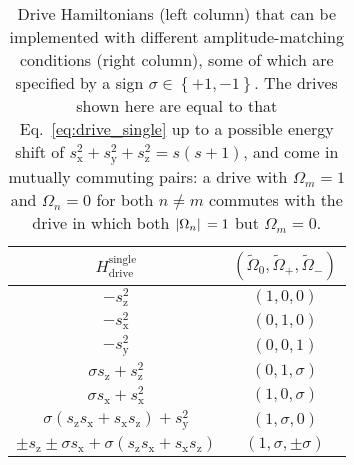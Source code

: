 \documentclass[nofootinbib,twocolumn]{revtex4-2}
\renewcommand{\t}{\text} %
\newcommand{\p}[1]{\left(#1\right)} %
\renewcommand{\set}[1]{\left\{#1\right\}} %
\newcommand{\1}{\mathds{1}}
\newcommand{\x}{\text{x}}
\newcommand{\y}{\text{y}}
\newcommand{\z}{\text{z}}
\begin{document}
\begin{table}
\centering
\caption{
Drive Hamiltonians (left column) that can be implemented with different amplitude-matching conditions (right column), some of which are specified by a sign $\sigma\in\set{+1,-1}$.
The drives shown here are equal to that Eq.~\eqref{eq:drive_single} up to a possible energy shift of $s_\x^2+s_\y^2+s_\z^2=s(s+1)$, and come in mutually commuting pairs: a drive with $\Omega_m=1$ and $\Omega_n=0$ for both $n\ne m$ commutes with the drive in which both $\abs*{\Omega_n}=1$ but $\Omega_m=0$.
}
\vspace{.5em}
\begin{tabular}{c|c}
  $H_{\t{drive}}^{\t{single}}$
  & $(\tilde\Omega_0,\tilde\Omega_+,\tilde\Omega_-)$
  \\ \hline\hline
  $-s_\z^2$ & $\p{1,0,0}$
  \\ \hline
   $-s_\x^2$ & $\p{0,1,0}$
  \\ \hline
  $-s_\y^2$ & $\p{0,0,1}$
  \\ \hline
  $\sigma s_\z + s_\z^2$ & $\p{0,1,\sigma}$
  \\ \hline
  $\sigma s_\x + s_\x^2$ & $\p{1,0,\sigma}$
  \\ \hline
  $\sigma\p{s_\z s_\x+s_\x s_\z} + s_\y^2$ & $\p{1,\sigma,0}$
  \\ \hline
  $\pm s_\z \pm \sigma s_\x + \sigma \p{s_\z s_\x + s_\x s_\z}$
  & $\p{1,\sigma,\pm\sigma}$
\end{tabular}
\label{tab:drives}
\end{table}
\end{document}
